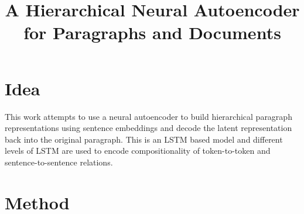 \documentclass[12pt]{article}
\begin{document}
\title{A Hierarchical Neural Autoencoder for Paragraphs and Documents}
\author{}
\date{}
\maketitle

\section{Idea}
  This work attempts to use a neural autoencoder to build hierarchical paragraph representations using sentence embeddings and decode the latent representation back into the original paragraph. This is an LSTM based model and different levels of LSTM are used to encode compositionality of token-to-token and sentence-to-sentence relations.

\section{Method}
\end{document}
